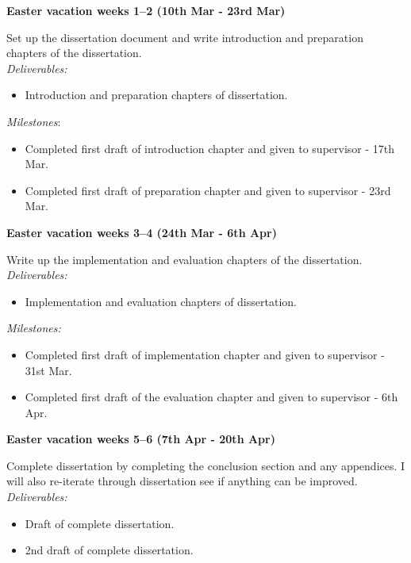 {\bf Easter vacation weeks 1--2 (10th Mar - 23rd Mar)} 

Set up the dissertation document and write introduction and preparation 
chapters of the dissertation. \\

{\em Deliverables:} 
\begin{itemize} 
    \item 
    Introduction and preparation chapters of dissertation.
\end{itemize}

{\em Milestones}: 
\begin{itemize}
    \item 
    Completed first draft of introduction chapter and given to supervisor 
    - 17th Mar.
    \item 
    Completed first draft of preparation chapter and given to supervisor 
    - 23rd Mar.
\end{itemize}




{\bf Easter vacation weeks 3--4 (24th Mar - 6th Apr)} 

Write up the implementation and evaluation chapters of the dissertation. \\

{\em Deliverables:} 
\begin{itemize} 
    \item 
    Implementation and evaluation chapters of dissertation.
\end{itemize}

{\em Milestones:}
\begin{itemize}
    \item 
    Completed first draft of implementation chapter and given to supervisor 
    - 31st Mar.
    \item 
    Completed first draft of the evaluation chapter and given to supervisor 
    - 6th Apr.
\end{itemize}




{\bf Easter vacation weeks 5--6 (7th Apr - 20th Apr)} 

Complete dissertation by completing the conclusion section and any appendices. 
I will also re-iterate through dissertation see if anything can be improved. \\

{\em Deliverables:} 
\begin{itemize} 
    \item 
    Draft of complete dissertation.
    \item 
    2nd draft of complete dissertation.
\end{itemize}

